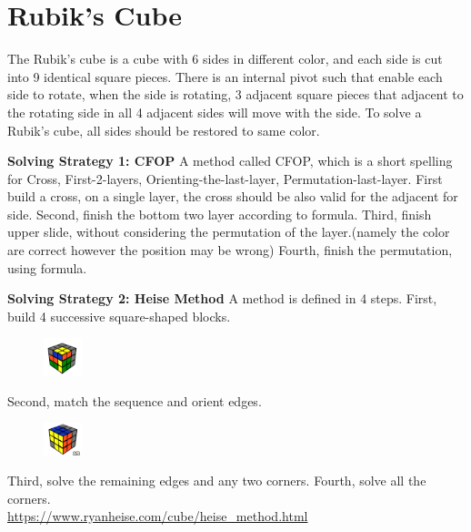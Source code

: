 \documentclass[A4paper]{article}
\begin{document}
\section{Rubik's Cube}
The Rubik's cube is a cube with 6 sides in different color, and each side is cut into 9 identical square pieces. There is an internal pivot such that enable each side to rotate, when the side is rotating, 3 adjacent square pieces that adjacent to the rotating side in all 4 adjacent sides will move with the side. To solve a Rubik's cube, all sides should be restored to same color. \\
\par \textbf{Solving Strategy 1: CFOP} A method called CFOP, which is a short spelling for Cross, First-2-layers, Orienting-the-last-layer, Permutation-last-layer. First build a cross, on a single layer, the cross should be also valid for the adjacent for side. Second, finish the bottom two layer according to formula. Third, finish upper slide, without considering the permutation of the layer.(namely the color are correct however the position may be wrong) Fourth, finish the permutation, using formula.
\par \textbf{Solving Strategy 2: Heise Method}  A method is defined in 4 steps. First, build 4 successive square-shaped blocks. 
\begin{figure}[!htbp]
\centering
\includegraphics[width=0.1\textwidth]{HW3_pb1.png}
\end{figure}
\begin{flushleft}
Second, match the sequence and orient edges.
\end{flushleft}
\begin{figure}[!htbp]
\centering
\includegraphics[width=0.1\textwidth]{HW3_pb2.png}
\end{figure}
Third, solve the remaining edges and any two corners. Fourth, solve all the corners. \\
\url{https://www.ryanheise.com/cube/heise_method.html} 
\end{document}
